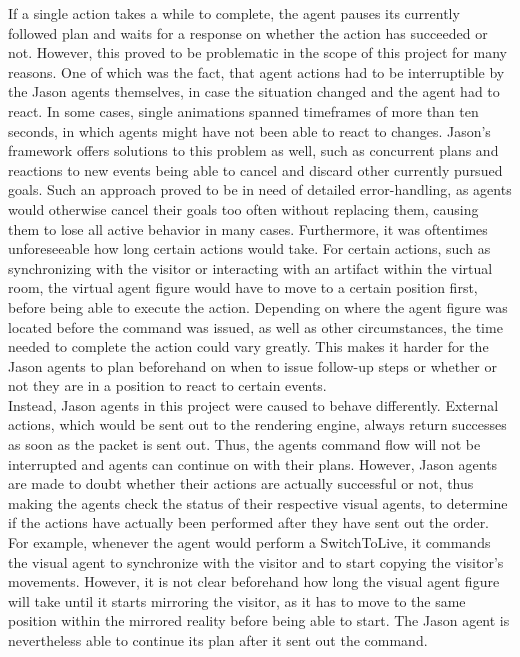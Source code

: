 \documentclass[draft,final]{vutinfth} %
\begin{document}
If a single action takes a while to complete, the agent pauses its currently followed plan and waits for a response on whether the action has succeeded or not. 
However, this proved to be problematic in the scope of this project for many reasons. 
One of which was the fact, that agent actions had to be interruptible by the Jason agents themselves, in case the situation changed and the agent had to react. 
In some cases, single animations spanned timeframes of more than ten seconds, in which agents might have not been able to react to changes. 
Jason’s framework offers solutions to this problem as well, such as concurrent plans and reactions to new events being able to cancel and discard other currently pursued goals. 
Such an approach proved to be in need of detailed error-handling, as agents would otherwise cancel their goals too often without replacing them, causing them to lose all active behavior in many cases. 
Furthermore, it was oftentimes unforeseeable how long certain actions would take. 
For certain actions, such as synchronizing with the visitor or interacting with an artifact within the virtual room, the virtual agent figure would have to move to a certain position first, before being able to execute the action. 
Depending on where the agent figure was located before the command was issued, as well as other circumstances, the time needed to complete the action could vary greatly. 
This makes it harder for the Jason agents to plan beforehand on when to issue follow-up steps or whether or not they are in a position to react to certain events. \\
Instead, Jason agents in this project were caused to behave differently. 
External actions, which would be sent out to the rendering engine, always return successes as soon as the packet is sent out. 
Thus, the agents command flow will not be interrupted and agents can continue on with their plans. 
However, Jason agents are made to doubt whether their actions are actually successful or not, thus making the agents check the status of their respective visual agents, to determine if the actions have actually been performed after they have sent out the order. 
For example, whenever the agent would perform a SwitchToLive, it commands the visual agent to synchronize with the visitor and to start copying the visitor’s movements. 
However, it is not clear beforehand how long the visual agent figure will take until it starts mirroring the visitor, as it has to move to the same position within the mirrored reality before being able to start. 
The Jason agent is nevertheless able to continue its plan after it sent out the command. 
\end{document}
